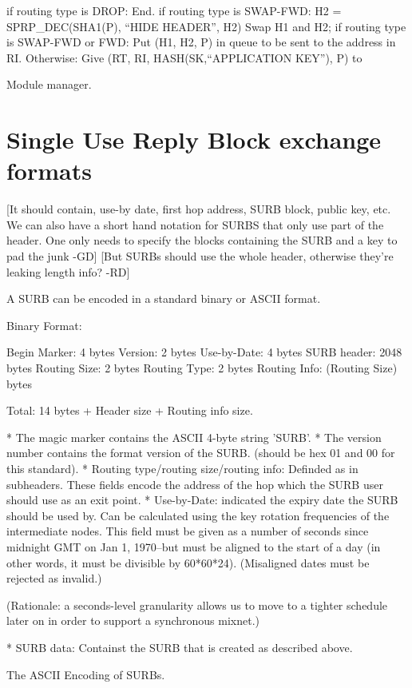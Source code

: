 	if routing type is DROP:
                End.
	if routing type is SWAP-FWD:
		H2 = SPRP_DEC(SHA1(P), ``HIDE HEADER'', H2)
		Swap H1 and H2;
        if routing type is SWAP-FWD or FWD:
	   	Put (H1, H2, P) in queue to be sent to the address in RI.
        Otherwise:
		Give (RT, RI, HASH(SK,``APPLICATION KEY''), P) to
		
Module manager. 

\section{Single Use Reply Block exchange formats}

[It should contain, use-by date, first hop address, 
 SURB block, public key, etc.
 We can also have a short hand notation for SURBS that only
 use part of the header. One only needs to specify the 
 blocks containing the SURB and a key to pad the junk -GD]
 [But SURBs should use the whole header, otherwise they're
  leaking length info? -RD]


A SURB can be encoded in a standard binary or ASCII format.

Binary Format:

   Begin Marker: 4 bytes
   Version:      2 bytes
   Use-by-Date:  4 bytes
   SURB header:  2048 bytes
   Routing Size: 2 bytes
   Routing Type: 2 bytes
   Routing Info: (Routing Size) bytes

   Total: 14 bytes + Header size + Routing info size.

* The magic marker contains the ASCII 4-byte string 'SURB'. 
* The version number contains the format version of the SURB.
  (should be hex 01 and 00 for this standard).
* Routing type/routing size/routing info: Definded as in subheaders.  
  These fields encode the address of the hop which the SURB user should
  use as an exit point.
* Use-by-Date: indicated the expiry date the SURB should be used by. Can
  be calculated using the key rotation frequencies of the intermediate
  nodes.  This field must be given as a number of seconds since
  midnight GMT on Jan 1, 1970--but must be aligned to the start of a
  day (in other words, it must be divisible by 60*60*24).
  (Misaligned dates must be rejected as invalid.)

  (Rationale: a seconds-level granularity allows us to move to a
  tighter schedule later on in order to support a synchronous mixnet.)

* SURB data: Containst the SURB that is created as described
  above. 

The ASCII Encoding of SURBs.

